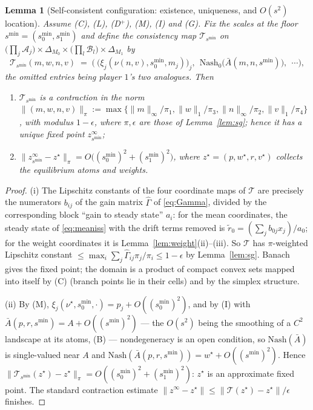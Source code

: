 \documentclass[11pt]{article}
\newtheorem{lemma}{Lemma}
\theoremstyle{definition}
\newcommand{\cA}{\mathcal{A}}
\newcommand{\cB}{\mathcal{B}}
\newcommand{\cT}{\mathcal{T}}
\begin{document}
\begin{lemma}[Self-consistent configuration: existence, uniqueness, and
$O(s^2)$ location]\label{lem:fp}
Assume (C), (L), (D$^+$), (M), (I) and (G). Fix the scales at the floor
$s^{\min} = (s^{\min}_0, s^{\min}_1)$ and define the \emph{consistency map}
$\cT_{s^{\min}}$ on $\big(\prod_j \cA_j\big) \times \Delta_{M_0} \times
\big(\prod_l \cB_l\big) \times \Delta_{M_1}$ by
\[
  \cT_{s^{\min}}(m, w, n, v) \;=\;
  \Big(\ \big(\xi_j(\nu(n,v), s^{\min}_0, m_j)\big)_j,\ \
  \mathrm{Nash}_0\big(\bar A(m,n,s^{\min})\big),\ \ \cdots \Big),
\]
the omitted entries being player $1$'s two analogues. Then
\begin{enumerate}
\item[(i)] $\cT_{s^{\min}}$ is a contraction in the norm
  $\|(m,w,n,v)\|_\pi := \max\{\|m\|_\infty/\pi_1, \|w\|_1/\pi_3,
  \|n\|_\infty/\pi_2, \|v\|_1/\pi_4\}$, with modulus $1 - \epsilon$, where
  $\pi,\epsilon$ are those of Lemma~\ref{lem:sg}; hence it has a unique fixed
  point $z^\infty_{s^{\min}}$;
\item[(ii)] $\|z^\infty_{s^{\min}} - z^\star\|_\pi = O\big((s^{\min}_0)^2 +
  (s^{\min}_1)^2\big)$, where $z^\star = (p, w^\star, r, v^\star)$ collects the
  equilibrium atoms and weights.
\end{enumerate}
\end{lemma}

\begin{proof}
(i) The Lipschitz constants of the four coordinate maps of $\cT$ are precisely
the numerators $b_{ij}$ of the gain matrix $\hat\Gamma$ of \eqref{eq:Gamma},
divided by the corresponding block ``gain to steady state'' $a_i$: for the mean
coordinates, the steady state of \eqref{eq:meaniss} with the drift terms removed
is $\tilde r_0 = (\sum_j b_{0j}x_j)/a_0$; for the weight coordinates it is
Lemma~\ref{lem:weight}(ii)--(iii). So $\cT$ has $\pi$-weighted Lipschitz constant
$\le \max_i \sum_{j} \hat\Gamma_{ij}\pi_j/\pi_i \le 1-\epsilon$ by
Lemma~\ref{lem:sg}. Banach gives the fixed point; the domain is a product of
compact convex sets mapped into itself by (C) (branch points lie in their cells)
and by the simplex structure.

(ii) By (M), $\xi_j(\nu^\star, s^{\min}_0, \cdot) = p_j + O((s^{\min}_0)^2)$, and
by (I) with $\bar A(p, r, s^{\min}) = A + O((s^{\min})^2)$ --- the $O(s^2)$ being
the smoothing of a $C^2$ landscape at its atoms, (B) --- nondegeneracy is an open
condition, so $\mathrm{Nash}(\bar A)$ is single-valued near $A$ and
$\mathrm{Nash}(\bar A(p,r,s^{\min})) = w^\star + O((s^{\min})^2)$. Hence
$\|\cT_{s^{\min}}(z^\star) - z^\star\|_\pi = O((s^{\min}_0)^2 + (s^{\min}_1)^2)$:
$z^\star$ is an approximate fixed point. The standard contraction estimate
$\|z^\infty - z^\star\| \le \|\cT(z^\star) - z^\star\|/\epsilon$ finishes.
\end{proof}
\end{document}
